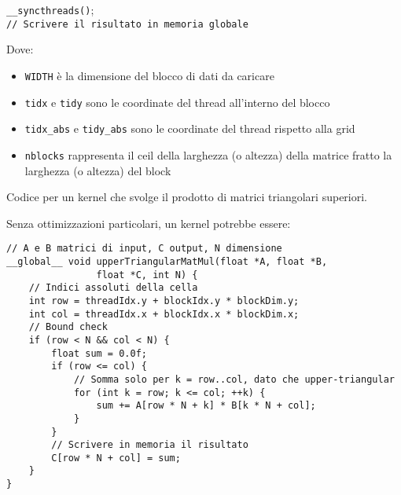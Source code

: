 \begin{questions}
\begin{solution}
\begin{center}
\begin{minipage}{.9\textwidth}
\begin{tcolorbox}
\begin{algorithm}[H]
{                            
                            \texttt{\_\_syncthreads()};\\
                        }
                        \texttt{// Scrivere il risultato in memoria globale}
                    \end{algorithm}
                \end{tcolorbox}
            \end{minipage}
        \end{center}
        
        Dove: 
        \begin{itemize}
            \item \texttt{WIDTH} è la dimensione del blocco di dati da caricare
            
            \item \texttt{tidx} e \texttt{tidy} sono le coordinate del thread all'interno del blocco
            
            \item \texttt{tidx\_abs} e \texttt{tidy\_abs} sono le coordinate del thread rispetto alla grid
            
            \item \texttt{nblocks} rappresenta il ceil della larghezza (o altezza) della matrice fratto la larghezza (o altezza) del block
        \end{itemize}
    \end{solution}
    
    \question Codice per un kernel che svolge il prodotto di matrici triangolari superiori.
    
    \begin{solution}
        Senza ottimizzazioni particolari, un kernel potrebbe essere:
        \begin{verbatim}
// A e B matrici di input, C output, N dimensione
__global__ void upperTriangularMatMul(float *A, float *B, 
                float *C, int N) {
    // Indici assoluti della cella
    int row = threadIdx.y + blockIdx.y * blockDim.y;
    int col = threadIdx.x + blockIdx.x * blockDim.x;
    // Bound check
    if (row < N && col < N) {
        float sum = 0.0f;
        if (row <= col) {
            // Somma solo per k = row..col, dato che upper-triangular
            for (int k = row; k <= col; ++k) {
                sum += A[row * N + k] * B[k * N + col];
            }
        }
        // Scrivere in memoria il risultato
        C[row * N + col] = sum;
    }
}
        \end{verbatim}
        

\end{solution}
\end{questions}
